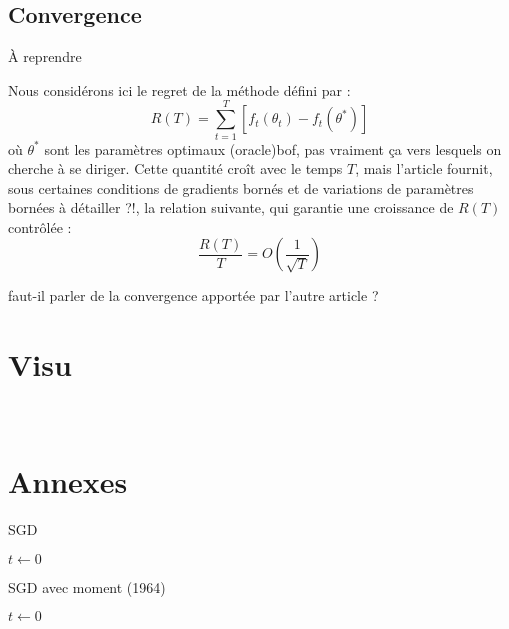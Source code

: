 \documentclass[11pt,a4paper, french]{article}
\newcommand{\dsum}[2]{\displaystyle\sum_{#1}^{#2}}
\begin{document}
\subsection{Convergence}

{\red À reprendre}

Nous considérons ici le regret de la méthode défini par : 
$$R(T)=\dsum{t=1}T[f_t(\theta_t)-f_t(\theta^*)]$$
où $\theta^*$ sont les paramètres optimaux (oracle){\red bof, pas vraiment ça} vers lesquels on cherche à se diriger. Cette quantité croît avec le temps $T$, mais l'article fournit, sous certaines conditions de gradients bornés et de variations de paramètres bornées {\red à détailler ?!},  la relation suivante, qui garantie une croissance de $R(T)$ contrôlée :
$$\dfrac{R(T)}{T}=O\left(\dfrac 1{\sqrt T}\right)$$

{\red faut-il parler de la convergence apportée par l'autre article ?}

\section{Visu}

\


\nocite{kingma2017adammethodstochasticoptimization}
\nocite{starmer2023optimization}
\renewcommand{\refname}{Sources}



\section{Annexes}




\begin{algorithm}
  \caption{SGD}
  $t\longleftarrow 0$ \\
\end{algorithm}

\begin{algorithm}
  \caption{SGD avec moment (1964)}
  $t\longleftarrow 0$ \\
\end{algorithm}
\end{document}
